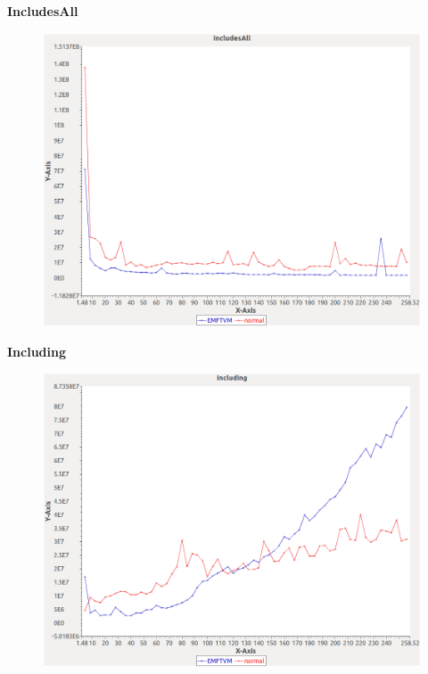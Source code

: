 \noindent\textbf{IncludesAll}

\begin{figure}[h]
\centering
\includegraphics[width=\textwidth]{graphs/orderedset/IncludesAll}
\end{figure}
\pagebreak

\noindent\textbf{Including}

\begin{figure}[h]
\centering
\includegraphics[width=\textwidth]{graphs/orderedset/Including}
\end{figure}
\pagebreak


